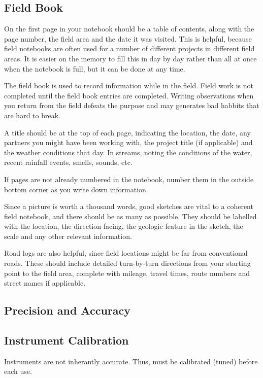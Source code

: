 \documentclass[12pt]{../SOP3_beta}
\begin{document}
\subsection*{Field Book}

\NP On the first page in your notebook should be a table of contents, along with the page number, the field area and the date it was visited. This is helpful, because field notebooks are often used for a number of different projects in different field areas. It is easier on the memory to fill this in day by day rather than all at once when the notebook is full, but it can be done at any time.

\NP The field book is used to record information while in the field. Field work is not completed until the field book entries are completed. Writing observations when you return from the field defeats the purpose and may generates bad habbits that are hard to break.

\NP A title should be at the top of each page, indicating the location, the date, any partners you might have been working with, the project title (if applicable) and the weather conditions that day. In streams, noting the conditions of the water, recent rainfall events, smells, sounds, etc.

\NP If pages are not already numbered in the notebook, number them in the outside bottom corner as you write down information.

\NP Since a picture is worth a thousand words, good sketches are vital to a coherent field notebook, and there should be as many as possible. They should be labelled with the location, the direction facing, the geologic feature in the sketch, the scale and any other relevant information.

\NP Road logs are also helpful, since field locations might be far from conventional roads. These should include detailed turn-by-turn directions from your starting point to the field area, complete with mileage, travel times, route numbers and street names if applicable. 

\subsection{Precision and Accuracy}


\subsection{Instrument Calibration}

\NP Instruments are not inherantly accurate. Thus, must be calibrated (tuned) before each use. 
\end{document}
